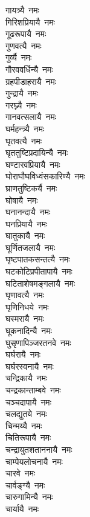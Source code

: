 \begin{multicols}{\maxColumns}
\begin{flushleft}
गायत्र्यै~नमः\\
गिरिशप्रियायै~नमः\\
गूढरूपायै~नमः\\
गुणवत्यै~नमः\\
गुर्व्यै~नमः\\
गौरववर्धिन्यै~नमः\\
ग्रहपीडाहरायै~नमः\\
गुन्द्रायै~नमः\\
गरघ्न्यै~नमः\\
गानवत्सलायै~नमः\hfill{}\\
घर्महन्त्र्यै~नमः\\
घृतवत्यै~नमः\\
घृततुष्टिप्रदायिन्यै~नमः\\
घण्टारवप्रियायै~नमः\\
घोराघौघविध्वंसकारिण्यै~नमः\\
घ्राणतुष्टिकर्यै~नमः\\
घोषायै~नमः\\
घनानन्दायै~नमः\\
घनप्रियायै~नमः\\
घातुकायै~नमः\hfill{}\\
घूर्णितजलायै~नमः\\
घृष्टपातकसन्तत्यै~नमः\\
घटकोटिप्रपीतापायै~नमः\\
घटिताशेषमङ्गलायै~नमः\\
घृणावत्यै~नमः\\
घृणिनिधये~नमः\\
घस्मरायै~नमः\\
घूकनादिन्यै~नमः\\
घुसृणापिञ्जरतनवे~नमः\\
घर्घरायै~नमः\hfill{}\\
घर्घरस्वनायै~नमः\\
चन्द्रिकायै~नमः\\
चन्द्रकान्ताम्बवे~नमः\\
चञ्चदापायै~नमः\\
चलद्युतये~नमः\\
चिन्मय्यै~नमः\\
चितिरूपायै~नमः\\
चन्द्रायुतशताननायै~नमः\\
चाम्पेयलोचनायै~नमः\\
चारवे~नमः\hfill{}\\
चार्वङ्ग्यै~नमः\\
चारुगामिन्यै~नमः\\
चार्यायै~नमः\\

\end{flushleft}
\end{multicols}
